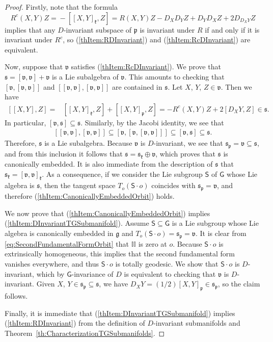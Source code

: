 \documentclass[11pt,a4paper,final]{amsart}
\newcommand{\s}{\mathsf}
\newcommand{\g}{\mathfrak}
\theoremstyle{definition}
\begin{document}
\begin{proof}
	Firstly, note that the formula
	\[
	R^{c}(X,Y)Z={}-[[X,Y]_{\g{k}},Z]=R(X,Y)Z-D_X D_Y Z+D_Y D_X Z+2D_{D_X Y}Z
	\]
	implies that any $D$-invariant subspace of $\g{p}$ is invariant under $R$ if and only if it is invariant under $R^{c}$, so (\ref{thItem:RDInvariant}) and (\ref{thItem:RcDInvariant}) are equivalent.
	
	Now, suppose that $\g{v}$ satisfies (\ref{thItem:RcDInvariant}).	
	We prove that $\g{s}=[\g{v},\g{v}]+\g{v}$ is a Lie subalgebra of $\g{v}$.
	This amounts to checking that $[\g{v},[\g{v},\g{v}]]$ and $[[\g{v},\g{v}],[\g{v},\g{v}]]$ are contained in $\g{s}$.
	Let $X$, $Y$, $Z\in \g{v}$.
	Then we have
	\[
	\begin{aligned}
		[[X,Y],Z]=&{}[[X,Y]_{\g{k}},Z]+[[X,Y]_{\g{p}},Z]=-R^{c}(X,Y)Z+2[D_X Y,Z]\in \g{s}.
	\end{aligned}
	\]
	In particular, $[\g{v},\g{s}]\subseteq \g{s}$.
	Similarly, by the Jacobi identity, we see that
	\[
	\begin{aligned}
		[[\g{v},\g{v}],[\g{v},\g{v}]]\subseteq[\g{v},[\g{v},[\g{v},\g{v}]]]\subseteq [\g{v},\g{s}]\subseteq \g{s}.
	\end{aligned}
	\]
	Therefore, $\g{s}$ is a Lie subalgebra.
	Because $\g{v}$ is $D$-invariant, we see that $\g{s}_{\g{p}}=\g{v}\subseteq \g{s}$, and from this inclusion it follows that $\g{s}=\g{s}_{\g{k}}\oplus\g{v}$, which proves that $\g{s}$ is canonically embedded.
	It is also immediate from the description of $\g{s}$ that $\g{s}_{\g{k}}=[\g{v},\g{v}]_{\g{k}}$.
	As a consequence, if we consider the Lie subgroup $\s{S}$ of $\s{G}$ whose Lie algebra is $\g{s}$, then the tangent space $T_{o}(\s{S}\cdot o)$ coincides with $\g{s}_{\g{p}}=\g{v}$, and therefore (\ref{thItem:CanonicallyEmbeddedOrbit}) holds.
	
	We now prove that (\ref{thItem:CanonicallyEmbeddedOrbit}) implies (\ref{thItem:DInvariantTGSubmanifold}).
	Assume $\s{S}\subseteq \s{G}$ is a Lie subgroup whose Lie algebra is canonically embedded in $\g{g}$ and $T_{o}(\s{S}\cdot o)=\g{s}_{\g{p}}=\g{v}$.
	It is clear from \eqref{eq:SecondFundamentalFormOrbit} that $\mathbb{II}$ is zero at $o$.
	Because $\s{S}\cdot o$ is extrinsically homogeneous, this implies that the second fundamental form vanishes everywhere, and thus $\s{S}\cdot o$ is totally geodesic.
	We show that $\s{S}\cdot o$ is $D$-invariant, which by $\s{G}$-invariance of $D$ is equivalent to checking that $\g{v}$ is $D$-invariant.
	Given $X$, $Y\in \g{s}_{\g{p}}\subseteq \g{s}$, we have $D_{X}Y=(1/2)[X,Y]_{\g{p}}\in \g{s}_{\g{p}}$, so the claim follows.
	
	Finally, it is immediate that (\ref{thItem:DInvariantTGSubmanifold}) implies (\ref{thItem:RDInvariant}) from the definition of $D$-invariant submanifolds and Theorem~\ref{th:CharacterizationTGSubmanifolds}. \qedhere
\end{proof}
\end{document}
